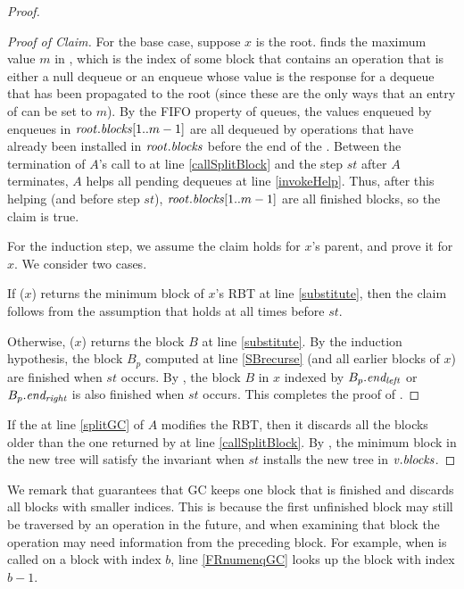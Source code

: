 \begin{proof}
\begin{proof}[Proof of Claim]
For the base case, suppose $x$ is the root.
 finds the maximum value $m$ in , which is the index of some block
that contains an operation that is either a null dequeue or an enqueue whose value is the response for a dequeue that has been propagated to the root (since these are the only ways that an entry of  can be set to $m$).
By the FIFO property of queues, the values enqueued by enqueues in $\mbox{\textnormal{\textit{root}}}.\mbox{\textit{blocks}}[1..m-1]$
are all dequeued by operations that have already been installed in $\mbox{\textnormal{\textit{root}}}.\mbox{\textit{blocks}}$ before
the end of the .
Between the termination of $A$'s call to  at line \ref{callSplitBlock}
and the  step $st$ after $A$ terminates,  $A$ helps all pending dequeues at line \ref{invokeHelp}.
Thus, after this helping (and before step $st$),
$\mbox{\textnormal{\textit{root}}}.\mbox{\textit{blocks}}[1..m-1]$ are all finished blocks, so the claim is true.

For the induction step, we assume the claim holds for $x$'s parent, and prove it for $x$.
We consider two cases.

If ($x$) returns the minimum block of $x$'s RBT at line \ref{substitute},
then the claim follows from the assumption that  holds at all times before $st$.

Otherwise, ($x$) returns the block $B$ at line \ref{substitute}.
By the induction hypothesis, the block $B_p$ computed at line \ref{SBrecurse}
(and all earlier blocks of $x$) are finished when $st$ occurs.
By , the block $B$ in $x$ indexed by $B_p.\mbox{\textit{end\textsubscript{left}}}$ or $B_p.\mbox{\textit{end\textsubscript{right}}}$
is also finished when $st$ occurs.  This completes the proof of .
\renewcommand{\qedsymbol}{$\diamondsuit$}
\end{proof}

If the  at line \ref{splitGC} of $A$ modifies the RBT, then it discards
all the blocks older than the one returned by  at line \ref{callSplitBlock}.
By , the minimum block in the new tree will satisfy the invariant when $st$
installs the new tree in $\mbox{\textnormal{\textit{v}}}.\mbox{\textit{blocks}}$.
\end{proof}

We remark that  guarantees that GC keeps one block that is finished and discards all blocks with smaller indices.
This is because the first unfinished block may still be traversed by an operation in the future,
and when examining that block the operation may need information from the preceding block.  For example,
when  is called on a block with index $b$, line \ref{FRnumenqGC} looks up the block with
index $b-1$.


